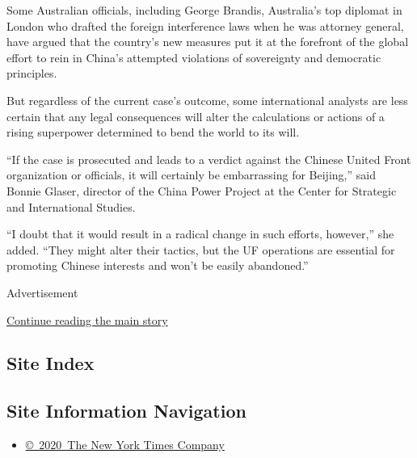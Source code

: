 Some Australian officials, including George Brandis, Australia's top
diplomat in London who drafted the foreign interference laws when he was
attorney general, have argued that the country's new measures put it at
the forefront of the global effort to rein in China's attempted
violations of sovereignty and democratic principles.

But regardless of the current case's outcome, some international
analysts are less certain that any legal consequences will alter the
calculations or actions of a rising superpower determined to bend the
world to its will.

``If the case is prosecuted and leads to a verdict against the Chinese
United Front organization or officials, it will certainly be
embarrassing for Beijing,'' said Bonnie Glaser, director of the China
Power Project at the Center for Strategic and International Studies.

``I doubt that it would result in a radical change in such efforts,
however,'' she added. ``They might alter their tactics, but the UF
operations are essential for promoting Chinese interests and won't be
easily abandoned.''

Advertisement

\protect\hyperlink{after-bottom}{Continue reading the main story}

\hypertarget{site-index}{%
\subsection{Site Index}\label{site-index}}

\hypertarget{site-information-navigation}{%
\subsection{Site Information
Navigation}\label{site-information-navigation}}

\begin{itemize}
\tightlist
\item
  \href{https://help.nytimes3xbfgragh.onion/hc/en-us/articles/115014792127-Copyright-notice}{©~2020~The
  New York Times Company}
\end{itemize}

